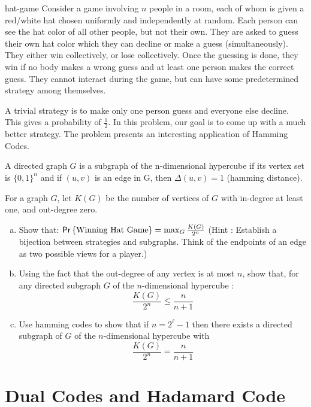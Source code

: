 \begin{exercise-prob}
\begin{show-ps5}{hat-game}   
Consider a game involving $n$ people in a room, each of whom is given a 
red/white hat chosen uniformly and independently at random. 
Each person can see the hat color of all other people, but not their own. 
They are asked to guess their own hat color which they can decline or make a guess (simultaneously).
They either win collectively, or lose collectively. Once the guessing is done, they win if no body makes a wrong guess and at least one person makes the correct guess.
They cannot interact during the game, but can have some predetermined strategy among themselves.

A trivial strategy is to make only one person guess and everyone else decline. This gives a probability of $\frac{1}{2}$.
In this problem, our goal is to come up with a much better strategy. The problem presents an interesting application of Hamming Codes.

A directed graph $G$ is a subgraph of the n-dimensional hypercube if its vertex set is $\{0,1\}^n$ and if $(u ,v)$ is an edge in G, then $\Delta(u,v) = 1$ (hamming distance).

For a graph $G$, let $K(G)$ be the number of vertices of $G$ with in-degree at least one, and out-degree zero.

\begin{enumerate}[(a)]
\item Show that: ${\sf Pr} \left\{ \textrm{Winning Hat Game} \right\} = \max_G \frac{K(G)}{2^n}$
(Hint : Establish a bijection between strategies and subgraphs. Think of the endpoints of an edge as two possible views for a player.)
\item Using the fact that the out-degree of any vertex is at most $n$, show that, for any directed subgraph $G$ of the $n$-dimensional hypercube :
\[ \frac{K(G)}{2^n} \le \frac{n}{n+1} \]
\item Use hamming codes to show that if $n = 2^\ell-1$ then there exists a directed subgraph of $G$ of the $n$-dimensional hypercube with 
$$\frac{K(G)}{2^n} = \frac{n}{n+1}$$
\end{enumerate}
\end{show-ps5}
\end{exercise-prob}

\section{Dual Codes and Hadamard Code}


